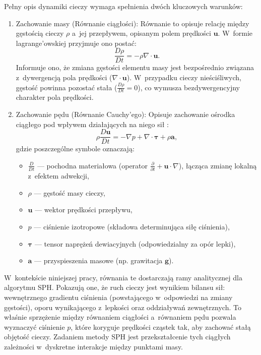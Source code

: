 Pełny opis dynamiki cieczy wymaga spełnienia dwóch kluczowych warunków:
\begin{enumerate}
\item Zachowanie masy (Równanie ciągłości):
Równanie to opisuje relację między gęstością cieczy $\rho$ a~jej przepływem, opisanym polem prędkości $\mathbf{u}$. W~formie lagrange'owskiej przyjmuje ono postać:
\begin{equation}
\frac{D\rho}{Dt} = -\rho \nabla \cdot \mathbf{u}.
\end{equation}
Informuje ono, że zmiana gęstości elementu masy jest bezpośrednio związana z~dywergencją pola prędkości ($\nabla \cdot \mathbf{u}$). W~przypadku cieczy nieściśliwych, gęstość powinna pozostać stała ($\frac{D\rho}{Dt} = 0$), co wymusza bezdywergencyjny charakter pola prędkości.

\item Zachowanie pędu (Równanie Cauchy’ego):
Opisuje zachowanie ośrodka ciągłego pod wpływem działających na niego sił \cite{landau1987fluid}:
    \begin{equation}
        \rho \frac{D\mathbf{u}}{Dt} = -\nabla p + \nabla \cdot \mathbf{\tau} + \rho \mathbf{a},
    \end{equation}gdzie poszczególne symbole oznaczają:
    \begin{itemize}
        \item $\frac{D}{Dt}$ --- pochodna materiałowa (operator $\frac{\partial}{\partial t} + \mathbf{u} \cdot \nabla$), łącząca zmianę lokalną z~efektem adwekcji,
        \item $\rho$ --- gęstość masy cieczy,
        \item $\mathbf{u}$ --- wektor prędkości przepływu,
        \item $p$ --- ciśnienie izotropowe (składowa determinująca siłę ciśnienia),
        \item $\mathbf{\tau}$ --- tensor naprężeń dewiacyjnych (odpowiedzialny za opór lepki),
        \item $\mathbf{a}$ --- przyspieszenia masowe (np. grawitacja $\mathbf{g}$).
    \end{itemize}
\end{enumerate}

W~kontekście niniejszej pracy, równania te dostarczają ramy analitycznej dla algorytmu SPH. Pokazują one, że ruch cieczy jest wynikiem bilansu sił: wewnętrznego gradientu ciśnienia (powstającego w~odpowiedzi na zmiany gęstości), oporu wynikającego z~lepkości oraz oddziaływań zewnętrznych. To właśnie sprzężenie między równaniem ciągłości a~równaniem pędu pozwala wyznaczyć ciśnienie $p$, które koryguje prędkości cząstek tak, aby zachować stałą objętość cieczy. Zadaniem metody SPH jest przekształcenie tych ciągłych zależności w~dyskretne interakcje między punktami masy.

